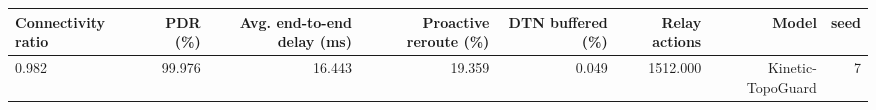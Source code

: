 \begin{tabular}{lrrrrrrr}
\toprule
Connectivity ratio & PDR (\%) & Avg. end-to-end delay (ms) & Proactive reroute (\%) & DTN buffered (\%) & Relay actions & Model & seed \\
\midrule
0.982 & 99.976 & 16.443 & 19.359 & 0.049 & 1512.000 & Kinetic-TopoGuard & 7 \\
\bottomrule
\end{tabular}